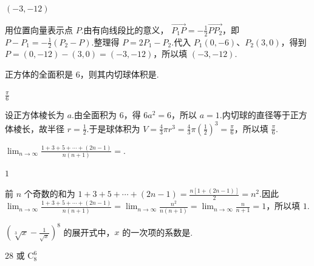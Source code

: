 \documentclass[UTF8,a4paper,oneside,11pt]{ctexbook}
\begin{document}
\begin{answer}
\(\left( -3,-12 \right)\)
\end{answer}

\begin{solution}
用位置向量表示点 \(P\).由有向线段比的意义，
\(\overrightarrow{P_1P}=-\frac{1}{2}\overrightarrow{PP_2}\)，即
\(P-P_1=-\frac{1}{2}(P_2-P)\).整理得
\(P=2P_1-P_2\).代入 \(P_1(0,-6)\)、\(P_2(3,0)\)，得到
\(P=(0,-12)-(3,0)=(-3,-12)\)，所以填 \(\left(-3,-12\right)\).
\end{solution}

\begin{problem}

正方体的全面积是 \(6\)，则其内切球体积是\fillinblank{}.
\end{problem}

\begin{answer}
\(\frac{\pi}{6}\)
\end{answer}

\begin{solution}
设正方体棱长为 \(a\).由全面积为 \(6\)，得 \(6a^2=6\)，所以 \(a=1\).内切球的直径等于正方体棱长，故半径 \(r=\frac{1}{2}\).于是球体积为
\(V=\frac{4}{3}\pi r^3=\frac{4}{3}\pi\left(\frac{1}{2}\right)^3=\frac{\pi}{6}\)，所以填 \(\frac{\pi}{6}\).
\end{solution}

\begin{problem}

\(\displaystyle\lim_{n\to\infty}\frac{1+3+5+\cdots+(2n-1)}{n(n+1)}=\)\fillinblank{}.
\end{problem}

\begin{answer}
\(1\)
\end{answer}

\begin{solution}
前 \(n\) 个奇数的和为
\(1+3+5+\cdots+(2n-1)=\frac{n\left[1+(2n-1)\right]}{2}=n^2\).因此
\(\displaystyle\lim_{n\to\infty}\frac{1+3+5+\cdots+(2n-1)}{n(n+1)}=\lim_{n\to\infty}\frac{n^2}{n(n+1)}=\lim_{n\to\infty}\frac{n}{n+1}=1\)，所以填 \(1\).
\end{solution}

\begin{problem}

\(\left( \sqrt[3]{x}-\frac{1}{\sqrt{x}} \right)^8\) 的展开式中，\(x\) 的一次项的系数是\fillinblank{}.
\end{problem}

\begin{answer}
\(28\) 或 \(\mathrm C_8^6\)
\end{answer}
\end{document}
